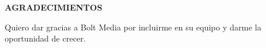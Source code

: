 \begin{center}
  {\Large  \bf{AGRADECIMIENTOS}}
\end{center}
\begin{center}
  Quiero dar gracias a Bolt Media por incluirme en su equipo y darme la oportunidad de crecer.
\end{center}
